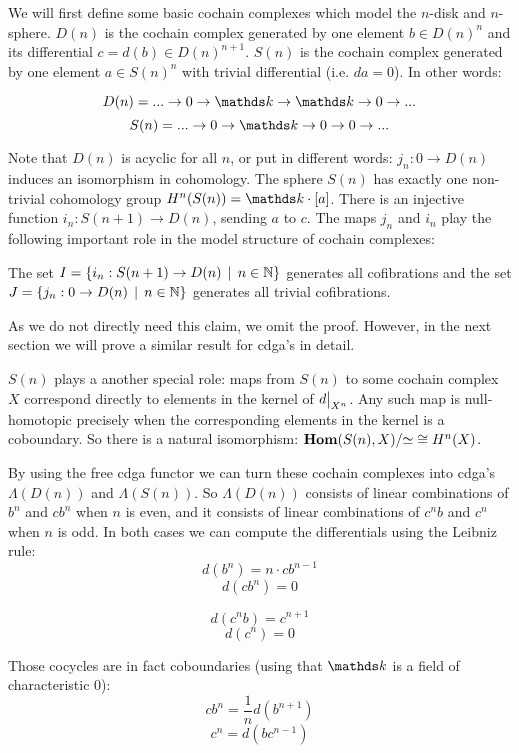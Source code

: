 
We will first define some basic cochain complexes which model the $n$-disk and $n$-sphere. $D(n)$ is the cochain complex generated by one element $b \in D(n)^n$ and its differential $c = d(b) \in D(n)^{n+1}$.  $S(n)$ is the cochain complex generated by one element $a \in S(n)^n$ with trivial differential (i.e. $d a = 0$). In other words:

$$ D(n) = ... \to 0 \to \k \to \k \to 0 \to ... $$
$$ S(n) = ... \to 0 \to \k \to 0 \to 0 \to ... $$

Note that $D(n)$ is acyclic for all $n$, or put in different words: $j_n : 0 \to D(n)$ induces an isomorphism in cohomology. The sphere $S(n)$ has exactly one non-trivial cohomology group $H^n(S(n)) = \k \cdot [a]$. There is an injective function $i_n : S(n+1) \to D(n)$, sending $a$ to $c$. The maps $j_n$ and $i_n$ play the following important role in the model structure of cochain complexes:

\begin{claim}
	The set $I = \{i_n : S(n+1) \to D(n) \,\mid\, n \in \mathbb{N}\}$ generates all cofibrations and the set $J = \{j_n : 0 \to D(n) \,\mid\, n \in \mathbb{N}\}$ generates all trivial cofibrations.
\end{claim}

As we do not directly need this claim, we omit the proof. However, in the next section we will prove a similar result for cdga's in detail.

$S(n)$ plays a another special role: maps from $S(n)$ to some cochain complex $X$ correspond directly to elements in the kernel of $\restr{d}{X^n}$. Any such map is null-homotopic precisely when the corresponding elements in the kernel is a coboundary. So there is a natural isomorphism: $\mathbf{Hom}(S(n), X) / {\simeq} \cong H^n(X)$.

By using the free cdga functor we can turn these cochain complexes into cdga's $\Lambda(D(n))$ and $\Lambda(S(n))$. So $\Lambda(D(n))$ consists of linear combinations of $b^n$  and $c b^n$ when $n$ is even, and it consists of linear combinations of $c^n b$ and $c^n$ when $n$ is odd. In both cases we can compute the differentials using the Leibniz rule:
$$ d(b^n) = n \cdot c b^{n-1} $$
$$ d(c b^n) = 0 $$

$$ d(c^n b) = c^{n+1} $$
$$ d(c^n) = 0 $$

Those cocycles are in fact coboundaries (using that $\k$ is a field of characteristic $0$):
$$ c b^n = \frac{1}{n} d(b^{n+1}) $$
$$ c^n = d(b c^{n-1}) $$

